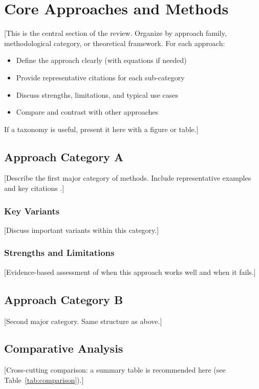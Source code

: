 \documentclass[conference]{IEEEtran}
\begin{document}
\section{Core Approaches and Methods}
[This is the central section of the review. Organize by approach family,
methodological category, or theoretical framework. For each approach:
\begin{itemize}
    \item Define the approach clearly (with equations if needed)
    \item Provide representative citations for each sub-category
    \item Discuss strengths, limitations, and typical use cases
    \item Compare and contrast with other approaches
\end{itemize}

If a taxonomy is useful, present it here with a figure or table.]

\subsection{Approach Category A}
[Describe the first major category of methods. Include representative examples
and key citations \cite{firstmethod2023}.]

\subsubsection{Key Variants}
[Discuss important variants within this category.]

\subsubsection{Strengths and Limitations}
[Evidence-based assessment of when this approach works well and when it fails.]

\subsection{Approach Category B}
[Second major category. Same structure as above.]

\subsection{Comparative Analysis}
[Cross-cutting comparison: a summary table is recommended here (see Table~\ref{tab:comparison}).]
\end{document}
